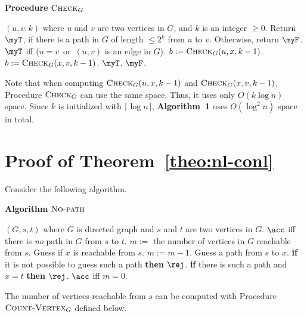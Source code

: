 \documentclass[11pt, a4paper]{article}
\begin{document}
{{\begin{algorithm}[h]
\label{proc:check}
\caption{{\bf Procedure} $\textsc{Check}_G$}
\begin{algorithmic}[1]
\REQUIRE
$(u,v,k)$ where $u$ and $v$ are two vertices in $G$, and $k$ is an integer $\geq 0$.
\ENSURE
Return $\myT$, if there is a path in $G$ of length $\leq 2^k$ from $u$ to $v$. Otherwise, return $\myF$.
\RETURN $\myT$ iff ($u=v$\ or\ $(u,v)$ is an edge in $G$). 
\ENDIF
{}
\STATE
$b:= \textsc{Check}_G(u,x,k-1)$.
\STATE
$b := \textsc{Check}_G(x,v,k-1)$.
\RETURN $\myT$.
\ENDIF
\ENDIF
\ENDFOR
\RETURN $\myF$.
\end{algorithmic}
\end{algorithm}

Note that when computing $\textsc{Check}_G(u,x,k-1)$ and $\textsc{Check}_G(x,v,k-1)$,
Procedure $\textsc{Check}_G$ can use the same space.
Thus, it uses only $O(k\log n)$ space.
Since $k$ is initialized with $\lceil \log n \rceil$,
{\bf Algorithm~1} uses $O(\log^2 n)$ space in total.


\section{Proof of Theorem~\ref{theo:nl-conl}}
\label{app:nl-conl}

Consider the following algorithm.
\begin{algorithm}[h]
\label{alg:no-path}
\caption{{\bf Algorithm} $\textsc{No-path}$}
\begin{algorithmic}[1]
\REQUIRE
$(G,s,t)$ where $G$ is directed graph and $s$ and $t$ are two vertices in $G$.
\ENSURE
$\acc$ iff there is {\em no} path in $G$ from $s$ to $t$.
\STATE
$m:=$ the number of vertices in $G$ reachable from $s$.
\STATE
{}
\STATE
Guess if $x$ is reachable from $s$.
\STATE
$m:=m-1$.
\STATE
Guess a path from $s$ to $x$.
\STATE
{\bf if} it is not possible to guess such a path {\bf then} $\rej$.
\STATE
{\bf if} there is such a path and $x=t$ {\bf then} $\rej$.
\ENDIF
\ENDFOR
\STATE
$\acc$ iff $m=0$.
\end{algorithmic}
\end{algorithm}

The number of vertices reachable from $s$ can be computed with Procedure $\textsc{Count-Vertex}_G$ 
defined below.

}}
\end{document}
